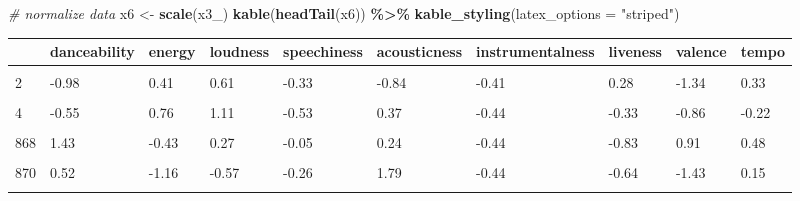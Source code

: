 \documentclass[
]{article}
\newenvironment{Shaded}{\begin{snugshade}}{\end{snugshade}}
\newcommand{\AttributeTok}[1]{\textcolor[rgb]{0.13,0.29,0.53}{#1}}
\newcommand{\CommentTok}[1]{\textcolor[rgb]{0.56,0.35,0.01}{\textit{#1}}}
\newcommand{\FunctionTok}[1]{\textcolor[rgb]{0.13,0.29,0.53}{\textbf{#1}}}
\newcommand{\NormalTok}[1]{#1}
\newcommand{\OtherTok}[1]{\textcolor[rgb]{0.56,0.35,0.01}{#1}}
\newcommand{\SpecialCharTok}[1]{\textcolor[rgb]{0.81,0.36,0.00}{\textbf{#1}}}
\newcommand{\StringTok}[1]{\textcolor[rgb]{0.31,0.60,0.02}{#1}}
\begin{document}
\begin{Shaded}
\begin{Highlighting}[]
\CommentTok{\# normalize data}
\NormalTok{x6 }\OtherTok{\textless{}{-}} \FunctionTok{scale}\NormalTok{(x3\_)}
\FunctionTok{kable}\NormalTok{(}\FunctionTok{headTail}\NormalTok{(x6)) }\SpecialCharTok{\%\textgreater{}\%}
  \FunctionTok{kable\_styling}\NormalTok{(}\AttributeTok{latex\_options =} \StringTok{"striped"}\NormalTok{)}
\end{Highlighting}
\end{Shaded}

\begin{table}
\centering
\begin{tabular}{l|l|l|l|l|l|l|l|l|l}
\hline
  & danceability & energy & loudness & speechiness & acousticness & instrumentalness & liveness & valence & tempo\\
\hline
\cellcolor{gray!6}{1} & \cellcolor{gray!6}{-0.57} & \cellcolor{gray!6}{-0.76} & \cellcolor{gray!6}{-0.17} & \cellcolor{gray!6}{-0.61} & \cellcolor{gray!6}{0.39} & \cellcolor{gray!6}{-0.43} & \cellcolor{gray!6}{1.29} & \cellcolor{gray!6}{-0.97} & \cellcolor{gray!6}{0.39}\\
\hline
2 & -0.98 & 0.41 & 0.61 & -0.33 & -0.84 & -0.41 & 0.28 & -1.34 & 0.33\\
\hline
\cellcolor{gray!6}{3} & \cellcolor{gray!6}{1.08} & \cellcolor{gray!6}{0.28} & \cellcolor{gray!6}{0.49} & \cellcolor{gray!6}{-0.41} & \cellcolor{gray!6}{-0.63} & \cellcolor{gray!6}{-0.44} & \cellcolor{gray!6}{-0.54} & \cellcolor{gray!6}{-0.45} & \cellcolor{gray!6}{-0.09}\\
\hline
4 & -0.55 & 0.76 & 1.11 & -0.53 & 0.37 & -0.44 & -0.33 & -0.86 & -0.22\\
\hline
\cellcolor{gray!6}{...} & \cellcolor{gray!6}{...} & \cellcolor{gray!6}{...} & \cellcolor{gray!6}{...} & \cellcolor{gray!6}{...} & \cellcolor{gray!6}{...} & \cellcolor{gray!6}{...} & \cellcolor{gray!6}{...} & \cellcolor{gray!6}{...} & \cellcolor{gray!6}{...}\\
\hline
868 & 1.43 & -0.43 & 0.27 & -0.05 & 0.24 & -0.44 & -0.83 & 0.91 & 0.48\\
\hline
\cellcolor{gray!6}{869} & \cellcolor{gray!6}{-0.25} & \cellcolor{gray!6}{0.04} & \cellcolor{gray!6}{0.04} & \cellcolor{gray!6}{-0.5} & \cellcolor{gray!6}{-0.28} & \cellcolor{gray!6}{-0.43} & \cellcolor{gray!6}{2.81} & \cellcolor{gray!6}{-0.38} & \cellcolor{gray!6}{0.41}\\
\hline
870 & 0.52 & -1.16 & -0.57 & -0.26 & 1.79 & -0.44 & -0.64 & -1.43 & 0.15\\
\hline
\cellcolor{gray!6}{871} & \cellcolor{gray!6}{-1.33} & \cellcolor{gray!6}{1.56} & \cellcolor{gray!6}{1.35} & \cellcolor{gray!6}{1.09} & \cellcolor{gray!6}{-0.84} & \cellcolor{gray!6}{-0.44} & \cellcolor{gray!6}{-0.21} & \cellcolor{gray!6}{0.09} & \cellcolor{gray!6}{2.4}\\
\hline
\end{tabular}
\end{table}
\end{document}
